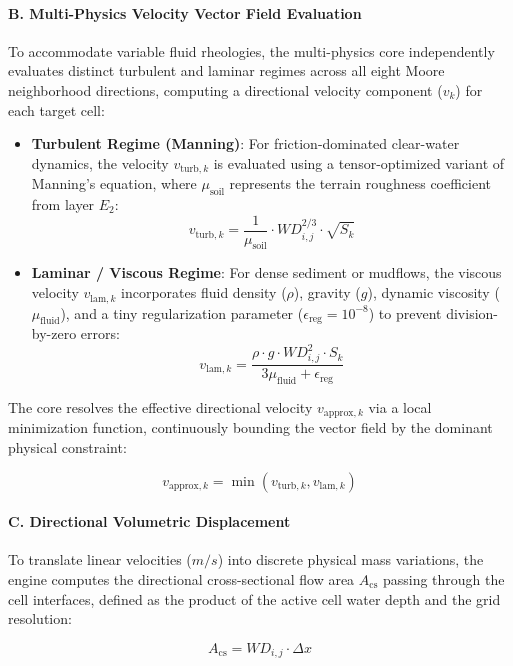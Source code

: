 \paragraph{B. Multi-Physics Velocity Vector Field Evaluation}

To accommodate variable fluid rheologies, the multi-physics core independently evaluates distinct turbulent and laminar regimes across all eight Moore neighborhood directions, computing a directional velocity component ($v_k$) for each target cell:

\begin{itemize}
    \item \textbf{Turbulent Regime (Manning)}: For friction-dominated clear-water dynamics, the velocity $v_{\text{turb}, k}$ is evaluated using a tensor-optimized variant of Manning's equation, where $\mu_{\text{soil}}$ represents the terrain roughness coefficient from layer $E_2$:
    $$v_{\text{turb}, k} = \frac{1}{\mu_{\text{soil}}} \cdot WD_{i,j}^{2/3} \cdot \sqrt{S_k}$$
    
    \item \textbf{Laminar / Viscous Regime}: For dense sediment or mudflows, the viscous velocity $v_{\text{lam}, k}$ incorporates fluid density ($\rho$), gravity ($g$), dynamic viscosity ($\mu_{\text{fluid}}$), and a tiny regularization parameter ($\epsilon_{\text{reg}} = 10^{-8}$) to prevent division-by-zero errors:
    $$v_{\text{lam}, k} = \frac{\rho \cdot g \cdot WD_{i,j}^2 \cdot S_k}{3\mu_{\text{fluid}} + \epsilon_{\text{reg}}}$$
\end{itemize}

The core resolves the effective directional velocity $v_{\text{approx}, k}$ via a local minimization function, continuously bounding the vector field by the dominant physical constraint:

$$v_{\text{approx}, k} = \min\left(v_{\text{turb}, k}, v_{\text{lam}, k}\right)$$

\paragraph{C. Directional Volumetric Displacement}

To translate linear velocities ($m/s$) into discrete physical mass variations, the engine computes the directional cross-sectional flow 
area $A_{\text{cs}}$ passing through the cell interfaces, defined as the product of the active cell water depth and the grid resolution:

$$A_{\text{cs}} = WD_{i,j} \cdot \Delta x$$


